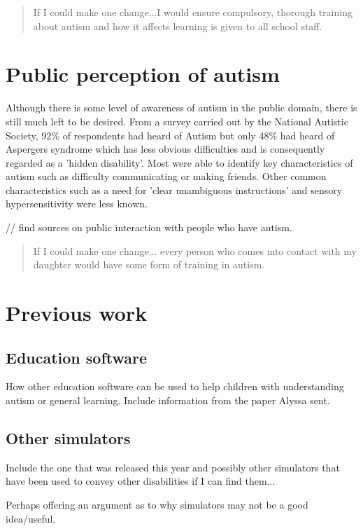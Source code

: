 \documentclass[11pt]{report}
\begin{document}
\begin{quote}
If I could make one change...I would ensure compulsory, thorough training about autism and how it affects learning is given to all school staff. \cite{nasschool}
\end{quote}

\section{Public perception of autism}
Although there is some level of awareness of autism in the public domain, there is still much left to be desired.  From a survey carried out by the National Autistic Society, 92\% of respondents had heard of Autism but only 48\% had heard of Aspergers syndrome which has less obvious difficulties and is consequently regarded as a 'hidden disability'. Most were able to identify key characteristics of autism such as difficulty communicating or making friends. Other common characteristics such as a need for 'clear unambiguous instructions' and sensory hypersensitivity were less known\cite{autismmisconception}. 

// find sources on public interaction with people who have autism.

\begin{quote}
If I could make one change... every person who comes into contact with my daughter would have some form of training in autism.\cite{nasschool}
\end{quote}


\section{Previous work}

\subsection{Education software}
How other education software can be used to help children with understanding autism or general learning. Include information from the paper Alyssa sent.

\subsection{Other simulators}
Include the one that was released this year and possibly other simulators that have been used to convey other disabilities if I can find them...

Perhaps offering an argument as to why simulators may not be a good idea/useful.
\end{document}
